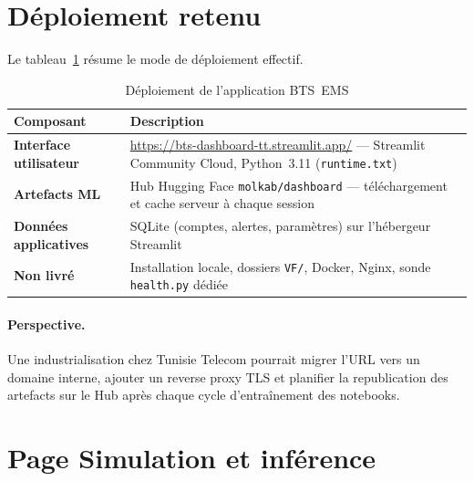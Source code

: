 \section{Déploiement retenu}
\label{sec:dep-modes}

Le tableau~\ref{tab:modes-deploy} résume le mode de déploiement effectif.

\begin{table}[htbp]
  \centering
  \caption{Déploiement de l'application BTS~EMS}
  \label{tab:modes-deploy}
  \begin{tabular}{@{}p{3.2cm}p{10.8cm}@{}}
    \toprule
    \textbf{Composant} & \textbf{Description} \\
    \midrule
    \textbf{Interface utilisateur}
      & \url{https://bts-dashboard-tt.streamlit.app/} — Streamlit Community Cloud,
        Python~3.11 (\texttt{runtime.txt}) \\
    \addlinespace
    \textbf{Artefacts ML}
      & Hub Hugging Face \texttt{molkab/dashboard} — téléchargement et cache
        serveur à chaque session \\
    \addlinespace
    \textbf{Données applicatives}
      & SQLite (comptes, alertes, paramètres) sur l'hébergeur Streamlit \\
    \addlinespace
    \textbf{Non livré}
      & Installation locale, dossiers \texttt{VF/}, Docker, Nginx, sonde
        \texttt{health.py} dédiée \\
    \bottomrule
  \end{tabular}
\end{table}

\paragraph{Perspective.}
Une industrialisation chez Tunisie Telecom pourrait migrer l'URL vers un domaine
interne, ajouter un reverse proxy TLS et planifier la republication des
artefacts sur le Hub après chaque cycle d'entraînement des notebooks.

\section{Page Simulation et inférence}
\label{sec:dep-simulation}

